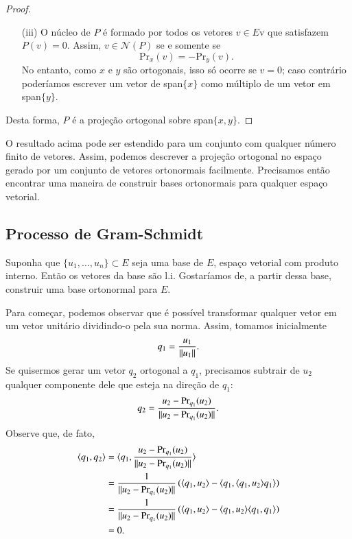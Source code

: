 \begin{proof}
\begin{itemize}
    \item[(iii)] O núcleo de $P$ é formado por todos os vetores $v\in E$v que satisfazem $P(v)=0$. Assim, $v\in {\mathcal{N}}(P)$ se e somente se
    \begin{equation*}
    	\text{Pr}_x(v) = -\text{Pr}_y(v).
    \end{equation*}
    No entanto, como $x$ e $y$ são ortogonais, isso só ocorre se $v=0$; caso contrário poderíamos escrever um vetor de span$\{x\}$ como múltiplo de um vetor em span$\{y\}$.
    \end{itemize}
    Desta forma, $P$ é a projeção ortogonal sobre span$\{x,y\}$.
\end{proof}

O resultado acima pode ser estendido para um conjunto com qualquer número finito de vetores. Assim, podemos descrever a projeção ortogonal no espaço gerado por um conjunto de vetores ortonormais facilmente. Precisamos então encontrar uma maneira de construir bases ortonormais para qualquer espaço vetorial.

\subsection{Processo de Gram-Schmidt}

Suponha que $\{u_1,\ldots,u_n\} \subset E$ seja uma base de $E$, espaço vetorial com produto interno. Então os vetores da base são l.i. Gostaríamos de, a partir dessa base, construir uma base ortonormal para $E$.

Para começar, podemos observar que é possível transformar qualquer vetor em um vetor unitário dividindo-o pela sua norma. Assim, tomamos inicialmente
\begin{equation*}
  q_1 = \frac{u_1}{\| u_1 \|}.
\end{equation*}
Se quisermos gerar um vetor $q_2$ ortogonal a $q_1$, precisamos subtrair de $u_2$ qualquer componente dele que esteja na direção de $q_1$:
\begin{equation*}
  q_2 = \frac{u_2 - \text{Pr}_{q_1}(u_2)}{\| u_2-\text{Pr}_{q_1}(u_2) \|}.
\end{equation*}
Observe que, de fato, 
\begin{align*}
\langle q_1, q_2 \rangle &= \langle q_1, \frac{u_2 - \text{Pr}_{q_1}(u_2)}{\| u_2-\text{Pr}_{q_1}(u_2) \|} \rangle\\
&= \frac{1}{\| u_2-\text{Pr}_{q_1}(u_2) \|}\left( \langle q_1, u_2 \rangle - \langle q_1, \langle q_1, u_2 \rangle q_1 \rangle\right)\\
&= \frac{1}{\| u_2-\text{Pr}_{q_1}(u_2) \|}\left( \langle q_1, u_2 \rangle - \langle q_1, u_2 \rangle\langle q_1, q_1 \rangle\right)\\
&= 0.
\end{align*}


